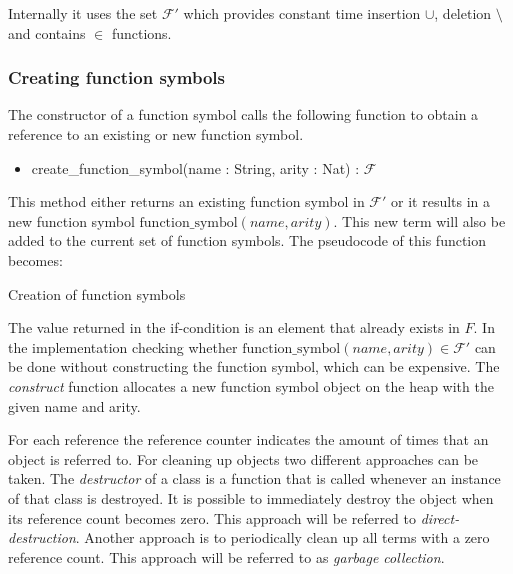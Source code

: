 \documentclass[10pt,a4paper]{article}
\newcommand{\functionsymbols}{\mathcal{F}}
\begin{document}
Internally it uses the set $\functionsymbols'$ which provides constant time insertion $\cup$, deletion $\setminus$ and contains $\in$ functions.

\subsubsection{Creating function symbols}

The constructor of a function symbol calls the following function to obtain a reference to an existing or new function symbol.

\begin{itemize}    
  \item create\_function\_symbol(name : String, arity : Nat) : $\functionsymbols$
\end{itemize}

\noindent This method either returns an existing function symbol in $\functionsymbols'$ or it results in a new function symbol $\text{function\_symbol}(name, arity)$. 
This new term will also be added to the current set of function symbols.
The pseudocode of this function becomes:

\begin{algorithm}[H]
 \caption{Creation of function symbols}\label{alg:create_function_symbol}
 \begin{algorithmic}[1]
  \If {$\text{function\_symbol}(name, arity) \in \functionsymbols'$}
  \EndIf
  
    
  \State {$\functionsymbols' \gets \functionsymbols' \cup \{f\}$}
  \EndProcedure
\end{algorithmic}
\end{algorithm}

\noindent The value returned in the if-condition is an element that already exists in $F$.
In the implementation checking whether $\text{function\_symbol}(name, arity) \in \functionsymbols'$ can be done without constructing the function symbol, which can be expensive.
The \emph{construct} function allocates a new function symbol object on the heap with the given name and arity.

For each reference the reference counter indicates the amount of times that an object is referred to. 
For cleaning up objects two different approaches can be taken. 
The \emph{destructor} of a class is a function that is called whenever an instance of that class is destroyed.
It is possible to immediately destroy the object when its reference count becomes zero. 
This approach will be referred to \emph{direct-destruction}. 
Another approach is to periodically clean up all terms with a zero reference count. 
This approach will be referred to as \emph{garbage collection}.
\end{document}
